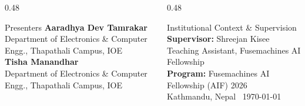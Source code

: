 {\begin{frame}[plain]
  \begin{columns}[T]
    \begin{column}{0.48\textwidth}
      \begin{card}{Presenters}
        \textbf{Aaradhya Dev Tamrakar} \\
        \small Department of Electronics \& Computer Engg., Thapathali Campus, IOE \\[0.2cm]
        \textbf{Tisha Manandhar} \\
        \small Department of Electronics \& Computer Engg., Thapathali Campus, IOE
      \end{card}
    \end{column}
    \begin{column}{0.48\textwidth}
      \begin{card}{Institutional Context \& Supervision}
        \textbf{Supervisor:} Shreejan Kisee \\
        \small Teaching Assistant, Fusemachines AI Fellowship \\[0.2cm]
        \textbf{Program:} Fusemachines AI Fellowship (AIF) 2026 \\
        \small Kathmandu, Nepal \hfill \textbar\ \today
      \end{card}
    \end{column}
  \end{columns}
\end{frame}
}
